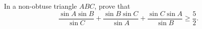 In a non-obtuse triangle $ABC$, prove that
\[ \frac{\sin A \sin B}{\sin C} + \frac{\sin B \sin C}{\sin A} + \frac{\sin C \sin A}{ \sin B} \ge \frac 52. \]